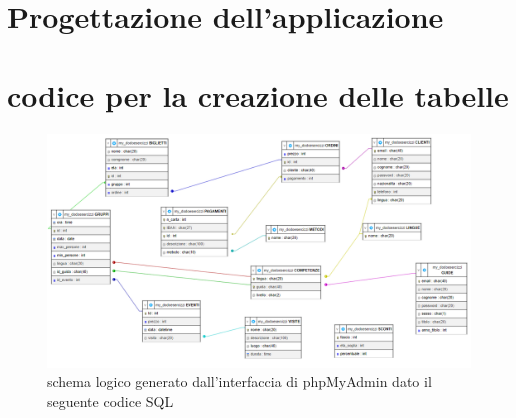 \documentclass[a4paper,12pt]{report}
\begin{document}
\chapter{Progettazione dell'applicazione}

\appendix
\chapter{codice per la creazione delle tabelle \label{A:CreateTable}}

\begin{figure}[H]
	\centering
	\includegraphics[height=0.67\textwidth,angle=90]{../resources/img/phpMyadmin.png}
	\caption{schema logico generato dall'interfaccia di phpMyAdmin dato il seguente codice SQL}
\end{figure}
\end{document}
